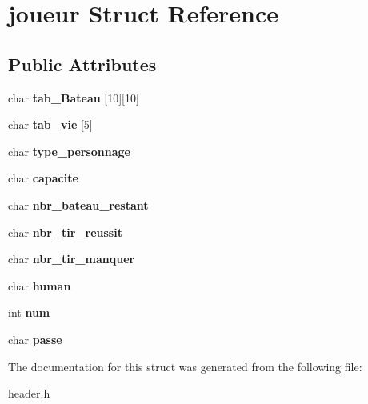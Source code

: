 \hypertarget{structjoueur}{}\section{joueur Struct Reference}
\label{structjoueur}
\subsection*{Public Attributes}
\begin{DoxyCompactItemize}
\item 
char {\bfseries tab\+\_\+\+Bateau} \mbox{[}10\mbox{]}\mbox{[}10\mbox{]}\hypertarget{structjoueur_a8330983218be380b269f3a22a122fe7b}{}\label{structjoueur_a8330983218be380b269f3a22a122fe7b}

\item 
char {\bfseries tab\+\_\+vie} \mbox{[}5\mbox{]}\hypertarget{structjoueur_a38a5beb688626440db7af531235dff64}{}\label{structjoueur_a38a5beb688626440db7af531235dff64}

\item 
char {\bfseries type\+\_\+personnage}\hypertarget{structjoueur_a830c2d827828cce162e9dc405bf86e3e}{}\label{structjoueur_a830c2d827828cce162e9dc405bf86e3e}

\item 
char {\bfseries capacite}\hypertarget{structjoueur_a35e78a63b7827c3a9f48cb6fc2d07372}{}\label{structjoueur_a35e78a63b7827c3a9f48cb6fc2d07372}

\item 
char {\bfseries nbr\+\_\+bateau\+\_\+restant}\hypertarget{structjoueur_a4f902c486f8d66cb85cf3b07abd0bd12}{}\label{structjoueur_a4f902c486f8d66cb85cf3b07abd0bd12}

\item 
char {\bfseries nbr\+\_\+tir\+\_\+reussit}\hypertarget{structjoueur_a19510a02b4ff3f6336da487b50806d71}{}\label{structjoueur_a19510a02b4ff3f6336da487b50806d71}

\item 
char {\bfseries nbr\+\_\+tir\+\_\+manquer}\hypertarget{structjoueur_ab65b89523a1f759daabcf0351f2b7d67}{}\label{structjoueur_ab65b89523a1f759daabcf0351f2b7d67}

\item 
char {\bfseries human}\hypertarget{structjoueur_acded73eabe589644a1addce7947b9a76}{}\label{structjoueur_acded73eabe589644a1addce7947b9a76}

\item 
int {\bfseries num}\hypertarget{structjoueur_ac92c8f63bcb8f1488e603f54169179f1}{}\label{structjoueur_ac92c8f63bcb8f1488e603f54169179f1}

\item 
char {\bfseries passe}\hypertarget{structjoueur_a925e41641fd3a1d54fb42044185e762d}{}\label{structjoueur_a925e41641fd3a1d54fb42044185e762d}

\end{DoxyCompactItemize}


The documentation for this struct was generated from the following file\+:\begin{DoxyCompactItemize}
\item 
header.\+h\end{DoxyCompactItemize}
